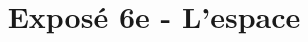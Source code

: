 \documentclass[12pt,a4paper]{article}
\title{Exposé 6e - L'espace}
\date{}
\begin{document}
	
\pagestyle{empty}

		
\begin{Large}
	
\begin{center}
	

	
	
	
\end{center}
\end{Large}	
\end{document}
